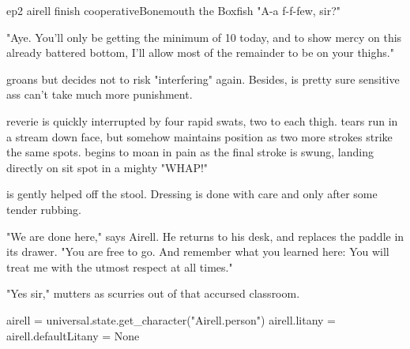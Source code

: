 \documentclass{book}
\begin{document}
\begin{childnode}{ep2 airell finish cooperative}{Bonemouth the Boxfish}
"A-a f-f-few, sir?" 

"Aye. You'll only be getting the minimum of 10 today, and to show mercy on this already battered bottom, I'll allow most of the remainder to be on your thighs."

\name{} groans but decides not to risk "interfering" again. Besides, \heshe{} is pretty sure \hisher{} sensitive ass can't take much more punishment.

\HisHer{} reverie is quickly interrupted by four rapid swats, two to each thigh. \names{} tears run in a stream down \hisher{} face, but \heshe{} somehow maintains \hisher{} position as two more 
strokes strike the same spots. \HeShe{} begins to moan in pain as the final stroke is swung, landing directly on \hisher{} sit spot in a mighty "WHAP!"

\name{} is gently helped off the stool. Dressing is done with care and only after some tender rubbing. 

"We are done here," says Airell. He returns to his desk, and replaces the paddle in its drawer. "You are free to go. And remember what you learned here: You will treat me with the utmost respect 
at all times."

"Yes sir," mutters \name{} as \heshe{} scurries out of that accursed classroom.


\begin{code}

    airell = universal.state.get_character("Airell.person")
    airell.litany = airell.defaultLitany = None

\end{code}


\end{childnode}
\end{document}
